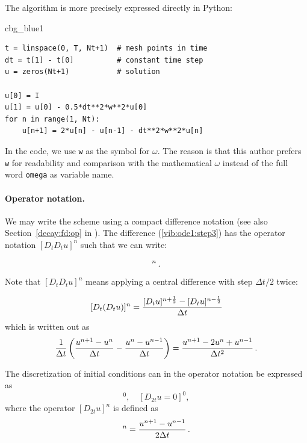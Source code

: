 \documentclass[%
oneside,                 %
final,                   %
10pt]{article}
\newenvironment{_cod_tight}[1]{
   \def\FrameCommand{\colorbox{#1}}
   \FrameRule0.6pt\MakeFramed {\FrameRestore}\vskip3mm}
   {\vskip0mm\endMakeFramed}
\newenvironment{cod}[1]{
\bgroup\rmfamily
\fboxsep=0mm\relax
\begin{_cod_tight}{#1}
\list{}{\parsep=-2mm\parskip=0mm\topsep=0pt\leftmargin=2mm
\rightmargin=2\leftmargin\leftmargin=4pt\relax}
\item\relax}
{\endlist\end{_cod_tight}\egroup}
\newenvironment{warning_mdfboxadmon}[1][]{
\begin{warning_mdfboxmdframed}[frametitle=#1]
}
{
\end{warning_mdfboxmdframed}
}
\begin{document}
\noindent
The algorithm is more precisely expressed directly in Python:

\begin{cod}{cbg_blue1}\begin{Verbatim}[numbers=none,fontsize=\fontsize{9pt}{9pt},baselinestretch=0.95,xleftmargin=2mm]
t = linspace(0, T, Nt+1)  # mesh points in time
dt = t[1] - t[0]          # constant time step
u = zeros(Nt+1)           # solution

u[0] = I
u[1] = u[0] - 0.5*dt**2*w**2*u[0]
for n in range(1, Nt):
    u[n+1] = 2*u[n] - u[n-1] - dt**2*w**2*u[n]
\end{Verbatim}
\end{cod}
\noindent


\begin{warning_mdfboxadmon}
In the code, we use \texttt{w} as the symbol for $\omega$.
The reason is that this author prefers \texttt{w} for readability
and comparison with the mathematical $\omega$ instead of
the full word \texttt{omega} as variable name.
\end{warning_mdfboxadmon}



\paragraph{Operator notation.}
We may write the scheme using a compact difference notation
(see also Section~\ref{decay:fd:op} in \cite{Langtangen_decay}).
The difference (\ref{vib:ode1:step3}) has the operator
notation $[D_tD_t u]^n$ such that we can write:

\begin{equation}
[D_tD_t u  + \omega^2 u = 0]^n
\tp
\label{vib:ode1:step4:op}
\end{equation}
Note that $[D_tD_t u]^n$ means applying a central difference with step $\Delta t/2$ twice:

\[ [D_t(D_t u)]^n = \frac{[D_t u]^{n+\half} - [D_t u]^{n-\half}}{\Delta t}\]
which is written out as
\[
\frac{1}{\Delta t}\left(\frac{u^{n+1}-u^n}{\Delta t} - \frac{u^{n}-u^{n-1}}{\Delta t}\right) = \frac{u^{n+1}-2u^n + u^{n-1}}{\Delta t^2}
\tp
\]

The discretization of initial conditions can in the operator notation
be expressed as
\begin{equation}
[u = I]^0,\quad [D_{2t} u = 0]^0,
\end{equation}
where the operator $[D_{2t} u]^n$ is defined as
\begin{equation}
[D_{2t} u]^n = \frac{u^{n+1} - u^{n-1}}{2\Delta t}
\tp
\end{equation}
\end{document}
